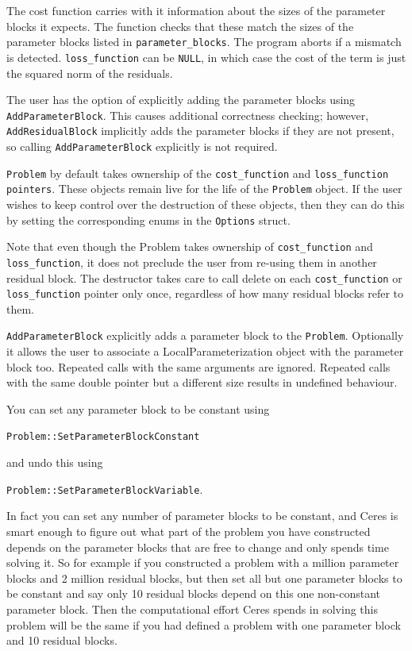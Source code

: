 The cost
   function carries with it information about the sizes of the
   parameter blocks it expects. The function checks that these match
   the sizes of the parameter blocks listed in \texttt{parameter\_blocks}. The
   program aborts if a mismatch is detected. \texttt{loss\_function} can be
   \texttt{NULL}, in which case the cost of the term is just the squared norm
   of the residuals.

  The user has the option of explicitly adding the parameter blocks
  using \texttt{AddParameterBlock}. This causes additional correctness
  checking; however, \texttt{AddResidualBlock} implicitly adds the parameter
   blocks if they are not present, so calling \texttt{AddParameterBlock}
   explicitly is not required.


   \texttt{Problem} by default takes ownership of the
  \texttt{cost\_function} and \texttt{loss\_function pointers}. These objects remain
   live for the life of the \texttt{Problem} object. If the user wishes to
  keep control over the destruction of these objects, then they can
  do this by setting the corresponding enums in the \texttt{Options} struct.


  Note that even though the Problem takes ownership of \texttt{cost\_function}
  and \texttt{loss\_function}, it does not preclude the user from re-using
  them in another residual block. The destructor takes care to call
  delete on each \texttt{cost\_function} or \texttt{loss\_function} pointer only once,
  regardless of how many residual blocks refer to them.

\texttt{AddParameterBlock} explicitly adds a parameter block to the \texttt{Problem}. Optionally it allows the user to associate a LocalParameterization object with the parameter block too. Repeated calls with the same arguments are ignored. Repeated
calls with the same double pointer but a different size results in undefined behaviour.

You can set any parameter block to be constant using

\texttt{Problem::SetParameterBlockConstant}

and undo this using

\texttt{Problem::SetParameterBlockVariable}.

In fact you can set any number of parameter blocks to be constant, and Ceres is smart enough to figure out what part of the problem you have constructed depends on the parameter blocks that are free to change and only spends time solving it. So for example if you constructed a problem with a million parameter blocks and 2 million residual blocks, but then set all but one parameter blocks to be constant and say only 10 residual blocks depend on this one non-constant parameter block. Then the computational effort Ceres spends in solving this problem will be the same if you had defined a problem with one parameter block and 10 residual blocks.

